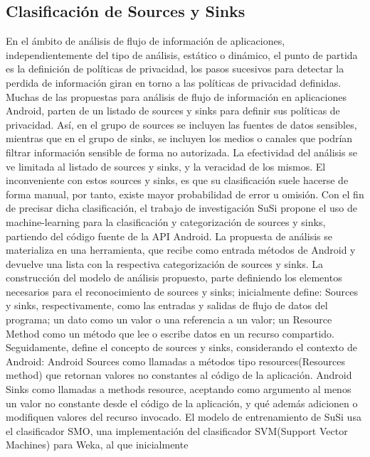 \subsection{Clasificación de Sources y Sinks}
\label{sec:susi}
En el ámbito de análisis de flujo de información de aplicaciones,
independientemente del tipo de análisis, estático o dinámico, el punto de
partida es la definición de políticas de privacidad, los pasos sucesivos para 
detectar la perdida de información giran en torno a las políticas de privacidad
definidas.
Muchas de las propuestas para análisis de flujo de información en aplicaciones
Android, parten de un listado de sources y sinks para definir sus políticas de
privacidad. Así, en el grupo de sources se incluyen las fuentes de datos
sensibles, mientras que en el grupo de sinks, se incluyen los medios o canales
que podrían filtrar información sensible de forma no autorizada. 
La efectividad del análisis se ve limitada al listado de sources y sinks, y la
veracidad de los mismos. El inconveniente con estos sources y sinks, es que su
clasificación suele hacerse de forma manual, por tanto, existe mayor
probabilidad de error u omisión.\newline
Con el fin de precisar dicha clasificación, el trabajo de investigación SuSi
propone el uso de machine-learning para la clasificación y categorización de
sources y sinks, partiendo del código fuente de la API Android.
La propuesta de análisis se materializa en una herramienta, que recibe como
entrada métodos de Android y devuelve una lista con la respectiva
categorización de sources y sinks.\newline
La construcción del modelo de
análisis propuesto, parte definiendo los elementos necesarios para el
reconocimiento de sources y sinks; inicialmente define:
Sources y sinks, respectivamente, como las entradas y salidas de flujo de datos del
programa; un dato como un valor o una referencia a un valor; un Resource Method
como un método que lee o escribe datos en un recurso compartido. Seguidamente,
define el concepto de sources y sinks, considerando el contexto de Android:
Android Sources como llamadas a métodos tipo resources(Resources method) que
retornan valores no constantes al código de la aplicación. Android Sinks como
llamadas a methods resource, aceptando como argumento al menos un valor no
constante desde el código de la aplicación, y qué además adicionen o modifiquen
valores del recurso invocado.
El modelo de entrenamiento de SuSi usa el clasificador SMO, una implementación
del clasificador SVM(Support Vector Machines) para Weka, al que inicialmente

